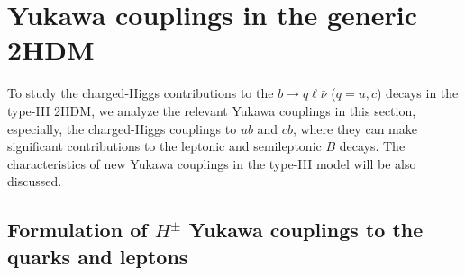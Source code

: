 \documentclass[prd,preprint,superscriptaddress,amsmath,amssymb]{revtex4}
\begin{document}
 

%
\section{ Yukawa couplings  in the generic 2HDM }

To study the charged-Higgs contributions to the $b \to q \ell \bar \nu$ ($q=u,c$) decays in the type-III 2HDM,  we analyze  the relevant Yukawa couplings in this section, especially,  the charged-Higgs couplings to $ub$ and $cb$, where they can make significant contributions to  the leptonic and semileptonic $B$ decays. The characteristics of new Yukawa couplings in the type-III model will be also discussed. 


\subsection{Formulation of $H^\pm$ Yukawa couplings to the quarks and leptons}
\end{document}
